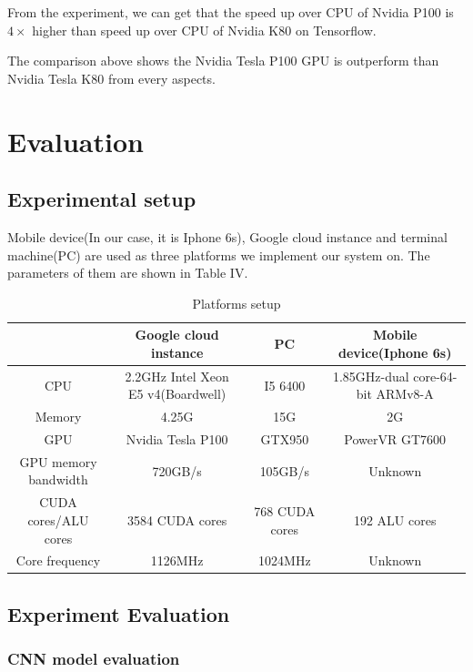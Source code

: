 \documentclass[conference]{IEEEtran}
\begin{document}
From the experiment, we can get that the speed up over CPU of Nvidia P100 is $4 \times$ higher than speed up over CPU of Nvidia K80 on Tensorflow. 

The comparison above shows the Nvidia Tesla P100 GPU is outperform than Nvidia Tesla K80 from every aspects. 

\section{Evaluation}

\subsection{Experimental setup}

Mobile device(In our case, it is Iphone 6s), Google cloud instance and terminal machine(PC) are used as three platforms we implement our system on. The parameters of them are shown in Table IV.  


\begin{table}
\caption{Platforms setup}
\centering
\begin{tabular}{|c|c|c|c|}
\hline
\textbf{} & \textbf{Google cloud instance }&\textbf{ PC }&
\textbf{Mobile device(Iphone 6s)}\\
\hline
CPU & 2.2GHz Intel Xeon E5 v4(Boardwell) & I5 6400 & 1.85GHz-dual core-64-bit ARMv8-A \\
\hline
Memory & 4.25G & 15G & 2G\\
\hline
GPU & Nvidia Tesla P100   & GTX950 & PowerVR GT7600 \\
\hline
GPU memory bandwidth & 720GB/s & 105GB/s & Unknown \\ 
\hline
CUDA cores/ALU cores & 3584 CUDA cores & 768 CUDA cores & 192 ALU cores \\
\hline
Core frequency & 1126MHz & 1024MHz & Unknown \\
\hline
\end{tabular}
\end{table}


\subsection{Experiment Evaluation}

\subsubsection{CNN model evaluation}
\end{document}
